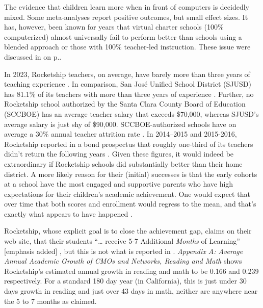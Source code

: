 The evidence that children learn more when in front of computers is decidedly mixed. Some meta-analyses report positive outcomes, but small effect sizes. It has, however, been known for years that virtual charter schools (100\% computerized) almost universally fail to perform better than schools using a blended approach or those with 100\% teacher-led instruction. These issue were discussed in  on p.\pageref{sec:types-instruction}.


In 2023, Rocketship teachers, on average, have barely more than three years of teaching experience \parencite{SCCOE2014}. In comparison, San José Unified School District (SJUSD) has 81.1\% of its teachers with more than three years of experience \parencite{USNews2023}. Further, no Rocketship school authorized by the Santa Clara County Board of Education (SCCBOE) has an average teacher salary that exceeds \$70,000, whereas SJUSD's average salary is just shy of \$90,000. SCCBOE-authorized schools have on average a 30\% annual teacher attrition rate \parencite{SCCOE2014}. In 2014–2015 and 2015-2016, Rocketship reported in a bond prospectus that roughly one-third of its teachers didn't return the following years \parencite{CSFA2017}. Given these figures, it would indeed be extraordinary if Rocketship schools did substantially better than their home district. A more likely reason for their (initial) successes is that the early cohorts at a school have the most engaged and supportive parents who have high expectations for their children's academic achievement. One would expect that over time that both scores and enrollment would regress to the mean, and that's exactly what appears to have happened \parencite{SCCOE2014}. 

Rocketship, whose explicit goal is to close the achievement gap, claims on their web site, that their students ``\ldots{} receive 5-7 Additional \textit{Months} of Learning'' [emphasis added] \parencite{RSED2023}, but this is not what is reported in \textcite{Raymond.etal2023}. \textit{Appendix A: Average Annual Academic Growth of CMOs and Networks, Reading and Math} \textcite[132]{Raymond.etal2023} shows Rocketship's estimated annual growth in reading and math to be 0.166 and 0.239 respectively. For a standard 180 day year (in California), this is just under 30 days growth in reading and just over 43 days in math, neither are anywhere near the 5 to 7 months as claimed.

